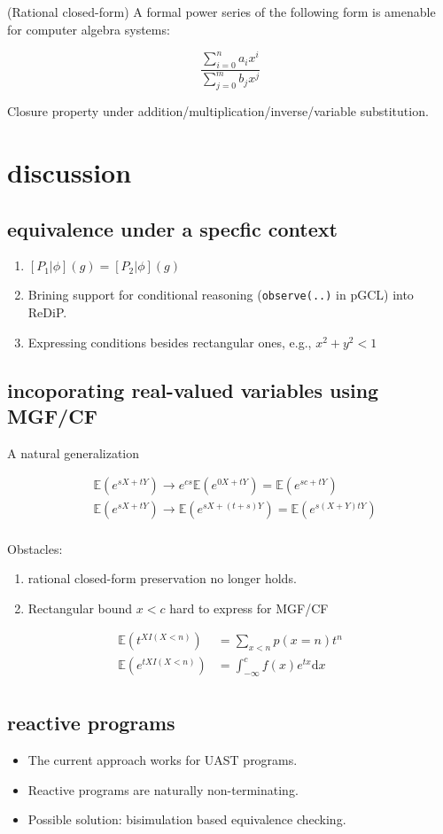\documentclass{article}
\newcommand{\E}{\mathbb{E}}
\begin{document}
 (Rational closed-form) A formal power series of the following form is amenable for computer algebra systems:

\[
	\dfrac{ \sum_{i=0}^n a_i x^i }
	{ \sum_{j=0}^m b_j x^j }
\]

Closure property under addition/multiplication/inverse/variable substitution.

\newpage
\section{discussion}

\subsection{equivalence under a specfic context}

\begin{enumerate}
	\item $[P_1|\phi](g) = [P_2|\phi](g)$
	\item Brining support for conditional reasoning (\texttt{observe(..)} in pGCL) into ReDiP.
	\item Expressing conditions besides rectangular ones, e.g., \(x^2 + y^2 < 1\)
\end{enumerate}


\subsection{incoporating real-valued variables using MGF/CF}

A natural generalization

\begin{align*}
	 & \E(e^{sX + tY}) \to e^{cs} \E(e^{0X + tY}) = \E(e^{sc + tY}) \\
	 & \E(e^{sX + tY}) \to \E(e^{sX + (t+s)Y}) = \E(e^{s(X+Y) tY})  \\
\end{align*}

Obstacles:

\begin{enumerate}
	\item rational closed-form preservation no longer holds.
	\item Rectangular bound $x<c$ hard to express for MGF/CF
\end{enumerate}

\begin{align*}
	\E(t^{X I(X<n)})  & = \sum_{x<n} p(x=n) t^n                      \\
	\E(e^{tX I(X<n)}) & = \int_{-\infty}^{c} f(x) e^{tx} \mathrm{d}x \\
\end{align*}

\subsection{reactive programs}

\begin{itemize}
	\item The current approach works for UAST programs.
	\item Reactive programs are naturally non-terminating.
	\item Possible solution: bisimulation based equivalence checking.
\end{itemize}
\end{document}
